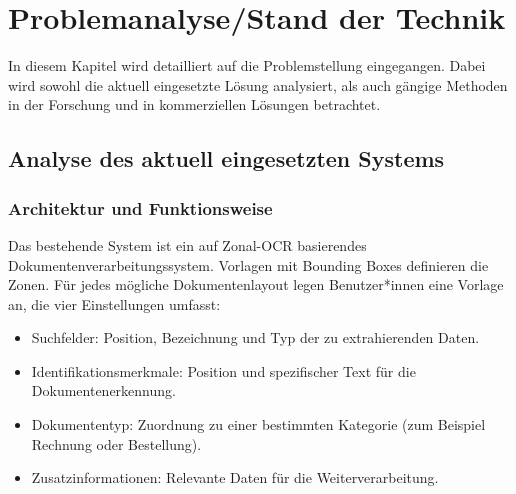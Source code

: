 \chapter{Problemanalyse/Stand der Technik}
\label{cha:problemanalyse-stand-der-technik}

In diesem Kapitel wird detailliert auf die Problemstellung eingegangen. Dabei wird sowohl die aktuell eingesetzte Lösung analysiert, als auch gängige Methoden in der Forschung und in kommerziellen Lösungen betrachtet.

\section{Analyse des aktuell eingesetzten Systems}
\label{sec:analyse-des-akutell-eingesetzten-systems}

\subsection{Architektur und Funktionsweise}
\label{subsec:architektur-und-funktionsweise}

Das bestehende System ist ein auf Zonal-\gls{OCR} basierendes 
Dokumenten\-verarbeitungs\-system\cite{multidata_help}. Vorlagen mit 
Bounding Boxes definieren die Zonen. Für jedes mögliche Dokumentenlayout 
legen Benutzer*innen eine Vorlage an, die vier Einstellungen umfasst:

\begin{itemize}
    \item Suchfelder: Position, Bezeichnung und Typ der zu extrahierenden Daten.
    \item Identifikationsmerkmale: Position und spezifischer Text für die Dokumentenerkennung.
    \item Dokumententyp: Zuordnung zu einer bestimmten Kategorie (zum Beispiel Rechnung oder Bestellung).
    \item Zusatzinformationen: Relevante Daten für die Weiterverarbeitung.
\end{itemize}

